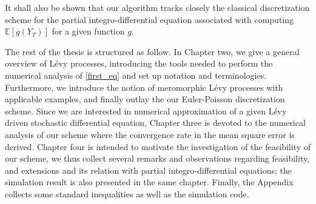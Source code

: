 It shall also be shown that our algorithm tracks closely the classical discretization scheme for the partial integro-differential equation associated with computing $\mathbb{E}[g(Y_T)]$ for a given function $g$. 

The rest of the thesis is structured as follow. In Chapter two, we give a general overview of L\'evy processes, introducing the tools needed to perform the numerical analysis of \eqref{first_eq} and set up notation and terminologies. Furthermore, we introduce the notion of meromorphic L\'evy processes with applicable examples, and finally outlay the our Euler-Poisson discretization scheme. Since we are interested in numerical approximation of a given L\'evy driven stochastic differential equation, Chapter three is devoted to the numerical analysis of our scheme  where the convergence rate in the mean square error is derived. Chapter four is intended to motivate the investigation of the feasibility of our scheme, we thus collect several remarks and observations regarding feasibility, and extensions and its relation with partial integro-differential equations; the simulation result is also presented in the same chapter. Finally, the Appendix collects some standard inequalities as well as the simulation code.

